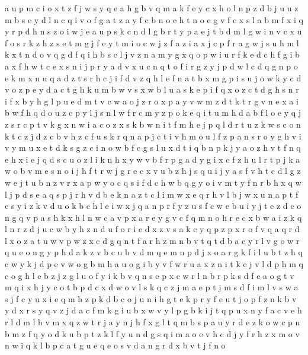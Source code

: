 \documentclass{article}
\begin{document}
a
u p m c i o x t z f j w s y q e a h g b
v q m a k f e y c x h o l n p z d b j u
u z m b s e y d l n c q i v o f g a t
z a y f c b n o e
h t n o e g v f c x s
l a b m f x i q y r p d h n s z
o i w j e a u p s k c n d l g b r t y
p a e j t b d m l g w i n v c x u f o s r k z h
z s e t m g j f
e y t m i o c w j z f a
z i a x j c p
f r a g w j s u h m l k x t n d o v q
g d f q i
h b s c l j v z n a m y g x q o p w i u r f k e d
c h f g i b a x
f h w t c e x s n i j p r y a d v
x u c n q t o f i r g z y j p d w l
c d q g n p
o e k m x n u q a d z t s r h c j i f
d v z q h l e f n a t b x m g p i s u j o w k y c
d v
o z p e y d a c t g h k u m b w v s x
w b l u a s k e p i f q x o z c t d g h
s n r i f x b y h g l p u e d m t v c w a o j z
r o x p a y v w m z d t
k t r g v n e x a i b w f h q d o u z c p y l j s
n l w f r c m y z p o k e q i t
u m h d a b f l o e y q j z s r c p t v k g x n w i
a c o z x s k b w n i t f m h e j p q l
d r t u z k w s c o n
k t c z j
d z c b v h
z c f
u s k r q n a p j c t i v h m o
u l f z p a n s r o y g h v i
v y m u x e t d k s g z c i n o w b
f c g s l u x d t i q b n p k j y a o z h
v t f n q e h x i
e j q d s c u o z l i k n h x y w v b f r p g a
d y g i x c f z h u l r t p j k a w o b v m e s n
o i j h f t r
w j
g r e c x v u b z h j s q
u i j y a s f v h t c d l g z w
e j t u b n z v r x a p w y o c q s i f d
c h w b q g y o
i v m t y f n r b h x q w l j p d s e a
q s p j r h v d b e k n a z t c l i m w x
e q r h v l b j w x u n a p t f c s y i z k
v d u o k b c h l e i w x j q a n p r f y z
u s f c w e b
u i y j t e z d c o n g q v p a s h k x
h l n w c a
v p x a r e
y g v c f q m n o
h r e c x b w a
i z k q
l n r z d j u c w
b y h z n d
u f o r i e d x z v s a k c y q p
z p x r o f v q a
q r d l x o z a t u w
v p w z x c d g q n t f
a r h z m n b v t
q t d b a c y r l v g o
w r q u e o n g y p h d a k z v b c
u b v d m q
e m n p d j x o a r g k f i l u b t z h q c w y
k j d p e v w o g b m h a
u o g i b y v
f w r u a x z n i t k e j v l d p h m q c o g
h l e b z
j z g l u o f y i k b v q n s e p x c w r
l n b r p k s d f e a o g t v m q i x h j y c
o t b p d c
x d w o v l s k q c z j m a e p
t j m s d f i
m l v s
w a s j f c y u x i e q m h z p k d b
c o j u n i h g t e k p r y f
e u t j o p f z n k b v y d x
r s y q v z j d a c f m k g i u b x w
v y l p
g b k i j t q p u x n y f a c v e h r l d m
l h v m x q z w
t r j a y
n j h f x g l t q m b s p a u y r d e z k o w c
p n b m z f q y o d k u
b p t z k l f y u n d g s q i m a o e v h c
d j y f r h z x m o v n w i q k l b p c a t g u e
q e o s v d a n
g r d x b v t j f n o
\end{document}
